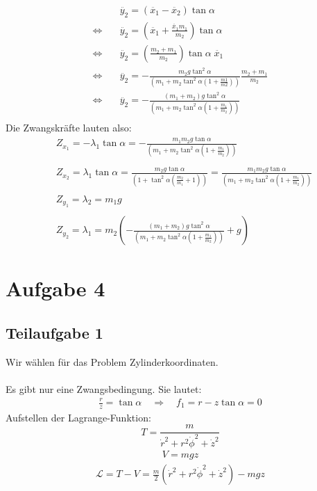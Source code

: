 \documentclass[a4paper,german,12pt,smallheadings]{scrartcl}
\begin{document}
\begin{align*}
& \quad \ddot{y_2}=\left(\ddot{x_1}-\ddot{x_2}\right) \tan \alpha\\
\Leftrightarrow & \quad \ddot{y_2}=\left(\ddot{x_1}+\frac{\ddot{x_1}m_1}{m_2}\right) \tan \alpha\\
\Leftrightarrow & \quad \ddot{y_2}=\left(\frac{m_2+m_1}{m_2}\right) \tan \alpha \; \ddot{x_1}\\
\Leftrightarrow & \quad \ddot{y_2}=-\frac{m_2g\tan^2 \alpha}{\left(m_1+m_2\tan^2 \alpha \left(1+\frac{m1}{m2}\right)\right)} \frac{m_2+m_1}{m_2}\\
\Leftrightarrow & \quad \ddot{y_2}=-\frac{\left(m_1+m_2\right)g\tan^2 \alpha}{\left(m_1+m_2\tan^2 \alpha \left(1+\frac{m_1}{m_2}\right)\right)}\\
\end{align*}
Die Zwangskräfte lauten also:
\begin{align*}
& Z_{x_1}=-\lambda_1 \tan \alpha=-\frac{m_1 m_2 g \tan \alpha}{\left(m_1+m_2 \tan^2 \alpha \left(1+\frac{m_1}{m_2}\right)\right)}\\
\\
& Z_{x_2}=\lambda_1 \tan \alpha=\frac{m_2 g \tan \alpha}{\left(1+\tan^2 \alpha \left(\frac{m_2}{m_1}+1\right) \right)}=\frac{m_1 m_2 g \tan \alpha}{\left(m_1+m_2 \tan^2 \alpha \left(1+\frac{m_1}{m_2}\right)\right)}\\
\\
& Z_{y_1}=\lambda_2=m_1g\\
\\
& Z_{y_2}=\lambda_1=m_2\left(-\frac{\left(m_1+m_2\right)g\tan^2 \alpha}{\left(m_1+m_2\tan^2 \alpha \left(1+\frac{m_1}{m_2}\right)\right)}+g\right)
\end{align*}

\section*{Aufgabe 4}
\subsection*{Teilaufgabe 1}
Wir wählen für das Problem Zylinderkoordinaten.\\
\\
Es gibt nur eine Zwangsbedingung. Sie lautet:
\begin{align*}
\frac{r}{z}=\tan \alpha \quad \Rightarrow \quad f_1=r-z \tan \alpha =0
\end{align*}
Aufstellen der Lagrange-Funktion:
\begin{equation}
T=\frac{m}{\dot{r}^2+r^2\dot{\phi}^2+\dot{z}^2}
\end{equation}
\begin{align*}
V=mgz
\end{align*}
\begin{align*}
\mathcal{L}=T-V=\frac{m}{2} \left(\dot{r}^2+r^2\dot{\phi}^2+\dot{z}^2\right) -mgz
\end{align*}
\end{document}
